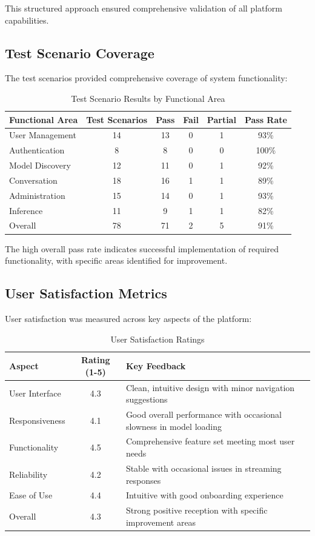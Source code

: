 This structured approach ensured comprehensive validation of all platform capabilities.

\subsection{Test Scenario Coverage}

The test scenarios provided comprehensive coverage of system functionality:

\begin{table}[h]
\centering
\caption{Test Scenario Results by Functional Area}
\label{tab:test-scenario-coverage}
\begin{tabular}{|l|c|c|c|c|c|}
\hline
\textbf{Functional Area} & \textbf{Test Scenarios} & \textbf{Pass} & \textbf{Fail} & \textbf{Partial} & \textbf{Pass Rate} \\
\hline
User Management & 14 & 13 & 0 & 1 & 93\% \\
\hline
Authentication & 8 & 8 & 0 & 0 & 100\% \\
\hline
Model Discovery & 12 & 11 & 0 & 1 & 92\% \\
\hline
Conversation & 18 & 16 & 1 & 1 & 89\% \\
\hline
Administration & 15 & 14 & 0 & 1 & 93\% \\
\hline
Inference & 11 & 9 & 1 & 1 & 82\% \\
\hline
Overall & 78 & 71 & 2 & 5 & 91\% \\
\hline
\end{tabular}
\end{table}

The high overall pass rate indicates successful implementation of required functionality, with specific areas identified for improvement.

\subsection{User Satisfaction Metrics}

User satisfaction was measured across key aspects of the platform:

\begin{table}[h]
\centering
\caption{User Satisfaction Ratings}
\label{tab:user-satisfaction}
\begin{tabular}{|l|c|l|}
\hline
\textbf{Aspect} & \textbf{Rating (1-5)} & \textbf{Key Feedback} \\
\hline
User Interface & 4.3 & Clean, intuitive design with minor navigation suggestions \\
\hline
Responsiveness & 4.1 & Good overall performance with occasional slowness in model loading \\
\hline
Functionality & 4.5 & Comprehensive feature set meeting most user needs \\
\hline
Reliability & 4.2 & Stable with occasional issues in streaming responses \\
\hline
Ease of Use & 4.4 & Intuitive with good onboarding experience \\
\hline
Overall & 4.3 & Strong positive reception with specific improvement areas \\
\hline
\end{tabular}
\end{table}

